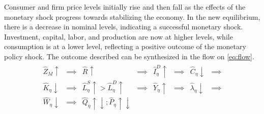\documentclass[../thesis.tex]{subfiles}
\begin{document}
	Consumer and firm price levels initially rise and then fall as the effects of the monetary shock progress towards stabilizing the economy. In the new equilibrium, there is a decrease in nominal levels, indicating a successful monetary shock. Investment, capital, labor, and production are now at higher levels, while consumption is at a lower level, reflecting a positive outcome of the monetary policy shock. The outcome described can be synthesized in the flow on \eqref{eq:flow}.
	\begin{align}
		\begin{matrix}
			\hat{Z}_{M} \uparrow &\implies &\hat{R}_{}\uparrow &\implies &\hat{I}_{\eta}^D \uparrow &\implies &\hat{C}_{\eta} \downarrow &\implies \\
			\hat{K}_{\eta} \downarrow &\implies &\hat{L}_{\eta}^S \uparrow > \hat{L}_{\eta}^D \uparrow &\implies &\hat{Y}_{\eta} \uparrow &\implies &\hat{\lambda}_{\eta} \downarrow &\implies \\
			\hat{W}_{\eta} \downarrow &\implies & \hat{Q}_{\eta} \uparrow \downarrow ; \hat{P}_{\eta} \uparrow \downarrow 
		\end{matrix} \label{eq:flow}
	\end{align}
	
	\begin{comment}

	\begin{alignat}{4}
	\hat{Z}_{M} \uparrow      &\implies \hat{R}_{}\uparrow                                    &\implies \hat{I}_{\eta}^D \uparrow &\implies \hat{C}_{\eta} \downarrow &\implies \nonumber \\
	\hat{K}_{\eta} \downarrow &\implies \hat{L}_{\eta}^S \uparrow > \hat{L}_{\eta}^D \uparrow &\implies \hat{W}_{\eta} \downarrow &\implies & \nonumber \\
	\hat{Y}_{\eta} \uparrow   &\implies \hat{\lambda}_{\eta} \downarrow                       &\implies \hat{Q}_{\eta} \uparrow \downarrow ; \hat{P}_{\eta} \uparrow \downarrow & \text{} & \label{flow2}
\end{alignat}


	\begin{matrix}
	\hat{Z}_{M}      \uparrow   \implies &
	\hat{R}_{}       \uparrow   \implies &
	\hat{I}_{\eta}^D \uparrow   \implies &
	\hat{C}_{\eta}   \downarrow \implies \\
	\hat{K}_{\eta}   \downarrow \implies &
	\hat{L}_{\eta}^S \uparrow > \hat{L}_{\eta}^D \uparrow   \implies &
	\hat{W}_{\eta}   \downarrow \implies &
	\hat{Y}_{\eta}   \uparrow   \implies \\
	\hat{\lambda}_{\eta} \downarrow \implies &
	\hat{Q}_{\eta} \uparrow \downarrow \implies &
	\hat{P}_{\eta} \uparrow \downarrow & \text{}
\end{matrix} \label{flow}

	\end{comment}
	
\end{document}
